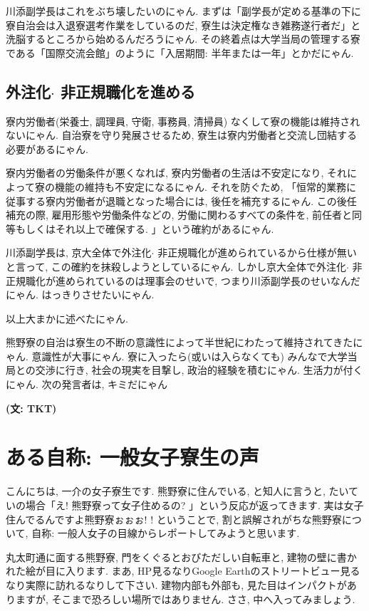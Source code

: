 \documentclass[10pt,b5jsbook,dvips,dvipdfmx,openany]{jsbook}
\theoremstyle{definition}
\begin{document}
			川添副学長はこれをぶち壊したいのにゃん. まずは「副学長が定める基準の下に寮自治会は入退寮選考作業をしているのだ, 寮生は決定権なき雑務遂行者だ」と洗脳するところから始めるんだろうにゃん. その終着点は大学当局の管理する寮である「国際交流会館」のように「入居期間: 半年または一年」とかだにゃん.

			\subsection{外注化$ \cdot $ 非正規職化を進める}
			寮内労働者(栄養士, 調理員, 守衛, 事務員, 清掃員) なくして寮の機能は維持されないにゃん. 自治寮を守り発展させるため, 寮生は寮内労働者と交流し団結する必要があるにゃん.

			寮内労働者の労働条件が悪くなれば, 寮内労働者の生活は不安定になり, それによって寮の機能の維持も不安定になるにゃん. それを防ぐため, 「恒常的業務に従事する寮内労働者が退職となった場合には, 後任を補充するにゃん. この後任補充の際, 雇用形態や労働条件などの, 労働に関わるすべての条件を, 前任者と同等もしくはそれ以上で確保する. 」という確約があるにゃん.

			川添副学長は, 京大全体で外注化$ \cdot $ 非正規職化が進められているから仕様が無いと言って, この確約を抹殺しようとしているにゃん. しかし京大全体で外注化$ \cdot $ 非正規職化が進められているのは理事会のせいで, つまり川添副学長のせいなんだにゃん. はっきりさせたいにゃん.

 			以上大まかに述べたにゃん.

			熊野寮の自治は寮生の不断の意識性によって半世紀にわたって維持されてきたにゃん. 意識性が大事にゃん. 寮に入ったら(或いは入らなくても) みんなで大学当局との交渉に行き, 社会の現実を目撃し, 政治的経験を積むにゃん. 生活力が付くにゃん.
次の発言者は, キミだにゃん

{\bf (文: TKT)}


		\section{ある自称: 一般女子寮生の声}

		こんにちは, 一介の女子寮生です. 熊野寮に住んでいる, と知人に言うと, たいていの場合「え! 熊野寮って女子住めるの? 」という反応が返ってきます. 実は女子住んでるんですよ熊野寮ぉぉぉ! ! ということで, 割と誤解されがちな熊野寮について, 自称: 一般人女子の目線からレポートしてみようと思います.

		丸太町通に面する熊野寮, 門をくぐるとおびただしい自転車と, 建物の壁に書かれた絵が目に入ります. まあ, HP見るなりGoogle Earthのストリートビュー見るなり実際に訪れるなりして下さい. 建物内部も外部も, 見た目はインパクトがありますが, そこまで恐ろしい場所ではありません. ささ, 中へ入ってみましょう.
\end{document}
